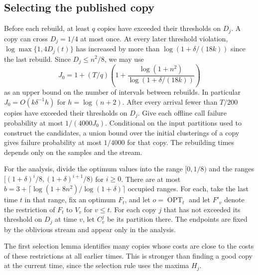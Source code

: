 \documentclass[11pt]{article}
\newcommand{\OPT}{\operatorname{OPT}}
\begin{document}
\subsection{Selecting the published copy}

Before each rebuild, at least $q$ copies have exceeded their thresholds
on $D_j$. A copy can cross $D_j=1/4$ at most once. At every later
threshold violation, $\log\max\{1,4D_j(t)\}$ has increased by more than
$\log(1+\delta/(18k))$ since the last rebuild.
Since $D_j\le n^2/8$, we may use
\[
 J_0=1+(T/q)\left(1+\frac{\log(1+n^2)}{\log(1+\delta/(18k))}\right)
\]
as an upper bound on the number of intervals between rebuilds. In particular
$J_0=O(k\delta^{-1}h)$ for $h=\log(n+2)$. After every arrival
fewer than $T/200$ copies have exceeded their thresholds on $D_j$. Give each offline call failure
probability at most $1/(4000J_0)$. Conditional on the input partitions used to construct the candidates,
a union bound over the initial clusterings of a copy gives failure probability
at most $1/4000$ for that copy.
The rebuilding times depends only on the samples and the stream.

For the analysis, divide the optimum values into the range $[0,1/8)$
and the ranges $[(1+\delta)^i/8,(1+\delta)^{i+1}/8)$ for $i\ge0$.
There are at most
$b=3+\lceil\log(1+8n^2)/\log(1+\delta)\rceil$ occupied ranges.
For each, take the last time $t$ in that range, fix an optimum $F_t$, and
let $o=\OPT_t$ and let $F'_v$ denote the restriction of $F_t$ to
$V_v$ for $v\le t$. For each copy $j$ that has not exceeded its threshold on $D_j$ at time $v$,
let $C^j_v$ be its partition there.
The endpoints are fixed by the oblivious stream and appear only in the analysis.

The first selection lemma identifies many copies whose
costs are close to the costs of these restrictions at all earlier times. This is
stronger than finding a good copy at
the current time, since the selection rule uses the maxima $H_j$.
\end{document}
